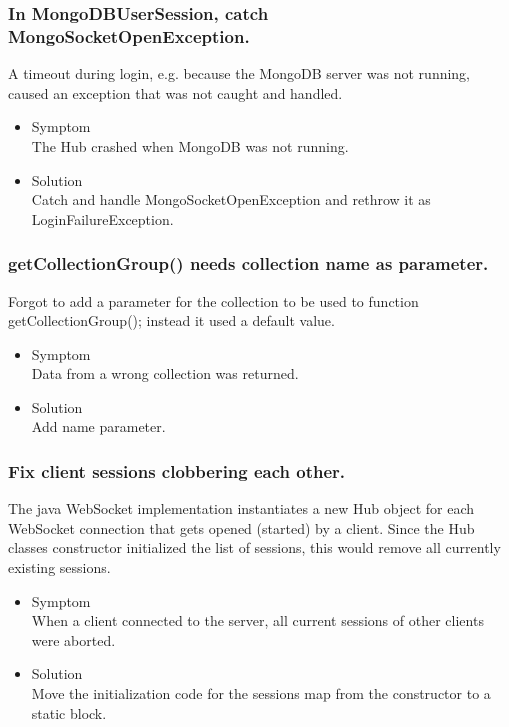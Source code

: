 \documentclass[oneside, english, final]{design}
\begin{document}
\subsubsection{In MongoDBUserSession, catch MongoSocketOpenException.}

A timeout during login, e.g. because the MongoDB server was not running, caused an exception that was not caught and handled.

\begin{itemize}
      \item{Symptom
            \\
            The Hub crashed when MongoDB was not running.
	}
      \item{Solution
            \\
            Catch and handle MongoSocketOpenException and rethrow it as LoginFailureException.
            }
\end{itemize}

\subsubsection{getCollectionGroup() needs collection name as parameter.}
Forgot to add a parameter for the collection to be used to function getCollectionGroup(); instead it used a default value.

\begin{itemize}
      \item{Symptom
            \\
            Data from a wrong collection was returned.
	}
      \item{Solution
            \\
            Add name parameter.
            }
\end{itemize}

\subsubsection{Fix client sessions clobbering each other.}

The java WebSocket implementation instantiates a new Hub object for each WebSocket connection that gets opened (started) by a client. Since the Hub classes constructor initialized the list of sessions, this would remove all currently existing sessions.

\begin{itemize}
      \item{Symptom
            \\
            When a client connected to the server, all current sessions of other clients were aborted.
	}
      \item{Solution
            \\
            Move the initialization code for the sessions map from the constructor to a static block.
            }
\end{itemize}
\end{document}
